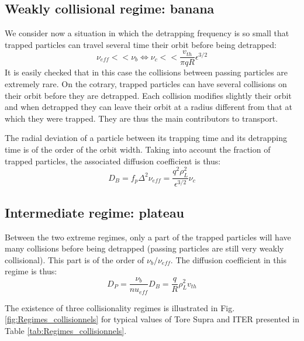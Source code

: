 				\subsection{Weakly collisional regime: banana}
				\label{RegimeBanane}


We consider now a situation in which the detrapping frequency is so small that trapped particles can travel several time their orbit before being detrapped:
\[
		\nu_{eff} << \nu_b \Longleftrightarrow \nu_c << \frac{v_{th}}{\pi q R}\epsilon^{3/2}
\]
It is easily checked that in this case the collisions between passing particles are extremely rare. On the cotrary, trapped particles can have several collisions on their orbit before they are detrapped. Each collision modifies slightly their orbit and when detrapped they can leave their orbit at a radius different from that at which they were trapped. They are thus the main contributors to transport. 

The radial deviation of a particle between its trapping time and its detrapping time is of the order of the orbit width. Taking into account the fraction of trapped particles, the associated diffusion coefficient is thus:
\[
		D_B = f_p \Delta^2 \nu_{eff} = \frac{q^2 \rho_L^2}{\epsilon^{3/2}}\nu_c
\] 

	
	
				\subsection{Intermediate regime: plateau}
				\label{RegimePlateau}

\hspace{1cm} Between the two extreme regimes, only a part of the trapped particles will have many collisions before being detrapped (passing particles are still very weakly collisional). This part is of the order of $\nu_b/\nu_{eff}$. The diffusion coefficient in this regime is thus:
\[
		D_P = \frac{\nu_b}{nu_{eff}}D_B = \frac{q}{R}\rho_L^2 v_{th}
\]

The existence of three collisionality regimes is illustrated in Fig. \ref{fig:Regimes_collisionnels} for typical values of Tore Supra and ITER presented in Table \ref{tab:Regimes_collisionnels}.


